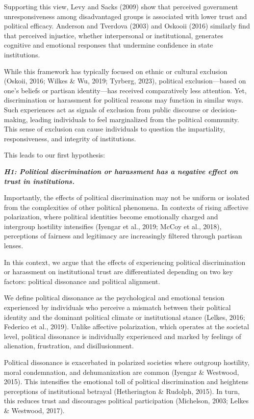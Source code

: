 \documentclass{article}
\begin{document}
Supporting this view, Levy and Sacks (2009) show that perceived government unresponsiveness among disadvantaged groups is associated with lower trust and political efficacy. Anderson and Tverdova (2003) and Oskooii (2016) similarly find that perceived injustice, whether interpersonal or institutional, generates cognitive and emotional responses that undermine confidence in state institutions.

While this framework has typically focused on ethnic or cultural exclusion (Oskoii, 2016; Wilkes & Wu, 2019; Tyrberg, 2023), political exclusion—based on one's beliefs or partisan identity—has received comparatively less attention. Yet, discrimination or harassment for political reasons may function in similar ways. Such experiences act as signals of exclusion from public discourse or decision-making, leading individuals to feel marginalized from the political community. This sense of exclusion can cause individuals to question the impartiality, responsiveness, and integrity of institutions.

This leads to our first hypothesis:

\emph{\textbf{\small
H1: Political discrimination or harassment has a negative effect on trust in institutions.
}}

Importantly, the effects of political discrimination may not be uniform or isolated from the complexities of other political phenomena. In contexts of rising affective polarization, where political identities become emotionally charged and intergroup hostility intensifies (Iyengar et al., 2019; McCoy et al., 2018), perceptions of fairness and legitimacy are increasingly filtered through partisan lenses.

In this context, we argue that the effects of experiencing political discrimination or harassment on institutional trust are differentiated depending on two key factors: political dissonance and political alignment. 

We define political dissonance as the psychological and emotional tension experienced by individuals who perceive a mismatch between their political identity and the dominant political climate or institutional stance (Lelkes, 2016; Federico et al., 2019). Unlike affective polarization, which operates at the societal level, political dissonance is individually experienced and marked by feelings of alienation, frustration, and disillusionment.

Political dissonance is exacerbated in polarized societies where outgroup hostility, moral condemnation, and dehumanization are common (Iyengar & Westwood, 2015). This intensifies the emotional toll of political discrimination and heightens perceptions of institutional betrayal (Hetherington \& Rudolph, 2015). In turn, this reduces trust and discourages political participation (Michelson, 2003; Lelkes \& Westwood, 2017).
\end{document}
